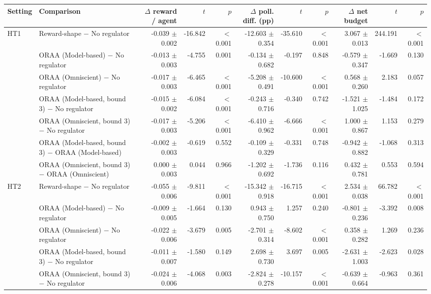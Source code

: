 \begin{tabular}{llrrrrrrrrr}
\toprule
Setting & Comparison & $\Delta$ reward / agent & $t$ & $p$ & $\Delta$ poll. diff. (pp) & $t$ & $p$ & $\Delta$ net budget & $t$ & $p$ \\
\midrule
HT1 & Reward-shape $-$ No regulator & -0.039 $\pm$ 0.002 & -16.842 & $<$0.001 & -12.603 $\pm$ 0.354 & -35.610 & $<$0.001 & 3.067 $\pm$ 0.013 & 244.191 & $<$0.001 \\
 & ORAA (Model-based) $-$ No regulator & -0.013 $\pm$ 0.003 & -4.755 & 0.001 & -0.134 $\pm$ 0.682 & -0.197 & 0.848 & -0.579 $\pm$ 0.347 & -1.669 & 0.130 \\
 & ORAA (Omniscient) $-$ No regulator & -0.017 $\pm$ 0.003 & -6.465 & $<$0.001 & -5.208 $\pm$ 0.491 & -10.600 & $<$0.001 & 0.568 $\pm$ 0.260 & 2.183 & 0.057 \\
 & ORAA (Model-based, bound 3) $-$ No regulator & -0.015 $\pm$ 0.002 & -6.084 & $<$0.001 & -0.243 $\pm$ 0.716 & -0.340 & 0.742 & -1.521 $\pm$ 1.025 & -1.484 & 0.172 \\
 & ORAA (Omniscient, bound 3) $-$ No regulator & -0.017 $\pm$ 0.003 & -5.206 & $<$0.001 & -6.410 $\pm$ 0.962 & -6.666 & $<$0.001 & 1.000 $\pm$ 0.867 & 1.153 & 0.279 \\
 & ORAA (Model-based, bound 3) $-$ ORAA (Model-based) & -0.002 $\pm$ 0.003 & -0.619 & 0.552 & -0.109 $\pm$ 0.329 & -0.331 & 0.748 & -0.942 $\pm$ 0.882 & -1.068 & 0.313 \\
 & ORAA (Omniscient, bound 3) $-$ ORAA (Omniscient) & 0.000 $\pm$ 0.003 & 0.044 & 0.966 & -1.202 $\pm$ 0.692 & -1.736 & 0.116 & 0.432 $\pm$ 0.781 & 0.553 & 0.594 \\
\addlinespace
HT2 & Reward-shape $-$ No regulator & -0.055 $\pm$ 0.006 & -9.811 & $<$0.001 & -15.342 $\pm$ 0.918 & -16.715 & $<$0.001 & 2.534 $\pm$ 0.038 & 66.782 & $<$0.001 \\
 & ORAA (Model-based) $-$ No regulator & -0.009 $\pm$ 0.005 & -1.664 & 0.130 & 0.943 $\pm$ 0.750 & 1.257 & 0.240 & -0.801 $\pm$ 0.236 & -3.392 & 0.008 \\
 & ORAA (Omniscient) $-$ No regulator & -0.022 $\pm$ 0.006 & -3.679 & 0.005 & -2.701 $\pm$ 0.314 & -8.602 & $<$0.001 & 0.358 $\pm$ 0.282 & 1.269 & 0.236 \\
 & ORAA (Model-based, bound 3) $-$ No regulator & -0.011 $\pm$ 0.007 & -1.580 & 0.149 & 2.698 $\pm$ 0.730 & 3.697 & 0.005 & -2.631 $\pm$ 1.003 & -2.623 & 0.028 \\
 & ORAA (Omniscient, bound 3) $-$ No regulator & -0.024 $\pm$ 0.006 & -4.068 & 0.003 & -2.824 $\pm$ 0.278 & -10.157 & $<$0.001 & -0.639 $\pm$ 0.664 & -0.963 & 0.361 \\

\end{tabular}
